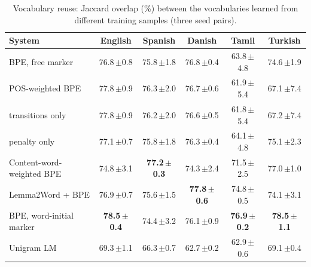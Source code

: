 \begin{table}[!ht]
\centering
\caption{Vocabulary reuse: Jaccard overlap (\%) between the vocabularies learned from different training samples (three seed pairs).}
\label{tab:jaccard}
\small
\setlength{\tabcolsep}{4pt}
\begin{tabular}{lccccc}
\toprule
System & English & Spanish & Danish & Tamil & Turkish \\
\midrule
BPE, free marker & 76.8\,{\scriptsize$\pm$0.8} & 75.8\,{\scriptsize$\pm$1.8} & 76.8\,{\scriptsize$\pm$0.4} & 63.8\,{\scriptsize$\pm$4.8} & 74.6\,{\scriptsize$\pm$1.9} \\
POS-weighted BPE & 77.8\,{\scriptsize$\pm$0.9} & 76.3\,{\scriptsize$\pm$2.0} & 76.7\,{\scriptsize$\pm$0.6} & 61.9\,{\scriptsize$\pm$5.4} & 67.1\,{\scriptsize$\pm$7.4} \\
\quad transitions only & 77.8\,{\scriptsize$\pm$0.9} & 76.2\,{\scriptsize$\pm$2.0} & 76.6\,{\scriptsize$\pm$0.5} & 61.8\,{\scriptsize$\pm$5.4} & 67.2\,{\scriptsize$\pm$7.4} \\
\quad penalty only & 77.1\,{\scriptsize$\pm$0.7} & 75.8\,{\scriptsize$\pm$1.8} & 76.3\,{\scriptsize$\pm$0.4} & 64.1\,{\scriptsize$\pm$4.8} & 75.1\,{\scriptsize$\pm$2.3} \\
\addlinespace[2pt]
Content-word-weighted BPE & 74.8\,{\scriptsize$\pm$3.1} & \textbf{77.2\,{\scriptsize$\pm$0.3}} & 74.3\,{\scriptsize$\pm$2.4} & 71.5\,{\scriptsize$\pm$2.5} & 77.0\,{\scriptsize$\pm$1.0} \\
Lemma2Word + BPE & 76.9\,{\scriptsize$\pm$0.7} & 75.6\,{\scriptsize$\pm$1.5} & \textbf{77.8\,{\scriptsize$\pm$0.6}} & 74.8\,{\scriptsize$\pm$0.5} & 74.1\,{\scriptsize$\pm$3.1} \\
BPE, word-initial marker & \textbf{78.5\,{\scriptsize$\pm$0.4}} & 74.4\,{\scriptsize$\pm$3.2} & 76.1\,{\scriptsize$\pm$0.9} & \textbf{76.9\,{\scriptsize$\pm$0.2}} & \textbf{78.5\,{\scriptsize$\pm$1.1}} \\
Unigram LM & 69.3\,{\scriptsize$\pm$1.1} & 66.3\,{\scriptsize$\pm$0.7} & 62.7\,{\scriptsize$\pm$0.2} & 62.9\,{\scriptsize$\pm$0.6} & 69.1\,{\scriptsize$\pm$0.4} \\
\bottomrule
\end{tabular}
\end{table}

